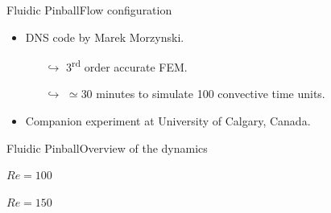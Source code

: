 \documentclass[usenames,dvipsnames,svgnames,10pt,aspectratio=169]{beamer}
\begin{document}
\begin{frame}[t, c]{Fluidic Pinball}{Flow configuration}
\begin{minipage}{.48\textwidth}
\begin{itemize}
			\item DNS code by Marek Morzynski.
			\begin{itemize}
				\item[$\hookrightarrow$] 3\textsuperscript{rd} order accurate FEM.
				\item[$\hookrightarrow$] $\simeq 30$ minutes to simulate 100 convective time units.
			\end{itemize}

			\item Companion experiment at University of Calgary, Canada.
		\end{itemize}
	\end{minipage}

	\vspace{1cm}
\end{frame}

\begin{frame}[t, c]{Fluidic Pinball}{Overview of the dynamics}
	\begin{minipage}{.48\textwidth}
		\centering

		$Re = 100$
	\end{minipage}%
	\hfill
	\begin{minipage}{.48\textwidth}
		\centering

			$Re = 150$
	\end{minipage}

	\vspace{1cm}
\end{frame}
%
%
%
\end{document}

